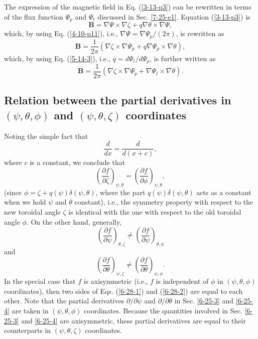 \documentclass{llncs}
\begin{document}
The expression of the magnetic field in Eq. (\ref{3-13-p3}) can be rewritten
in terms of the flux function $\Psi_p$ and $\Psi_t$ discussed in Sec.
\ref{7-25-e1}. Equation (\ref{3-13-p3}) is
\begin{equation}
  \label{3-20-a2} \mathbf{B}= \nabla \Psi \times \nabla \zeta + q \nabla
  \theta \times \nabla \Psi,
\end{equation}
which, by using Eq. (\ref{4-10-p11}), i.e., $\nabla \Psi = \nabla \Psi_p / (2
\pi)$, is rewritten as
\begin{equation}
  \label{4-10-p8} \mathbf{B}= \frac{1}{2 \pi} (\nabla \zeta \times \nabla
  \Psi_p + q \nabla \Psi_p \times \nabla \theta),
\end{equation}
which, by using Eq. (\ref{5-14-3}), i.e., $q = d \Psi_t / d \Psi_p$, is
further written as
\begin{equation}
  \label{6-30-e1} \mathbf{B}= \frac{1}{2 \pi} (\nabla \zeta \times \nabla
  \Psi_p + \nabla \Psi_t \times \nabla \theta) .
\end{equation}
\subsection{Relation between the partial derivatives in $(\psi, \theta, \phi)$
and $(\psi, \theta, \zeta)$ coordinates}

Noting the simple fact that
\begin{equation}
  \frac{d}{d x} = \frac{d}{d (x + c)},
\end{equation}
where $c$ is a constant, we conclude that
\begin{equation}
  \left( \frac{\partial f}{\partial \zeta} \right)_{\psi, \theta} = \left(
  \frac{\partial f}{\partial \phi} \right)_{\psi, \theta},
\end{equation}
(since $\phi = \zeta + q (\psi) \delta (\psi, \theta)$, where the part $q
(\psi) \delta (\psi, \theta)$ acts as a constant when we hold $\psi$ and
$\theta$ constant), i.e., the symmetry property with respect to the new
toroidal angle $\zeta$ is identical with the one with respect to the old
toroidal angle $\phi$. On the other hand, generally,
\begin{equation}
  \label{6-28-1} \left( \frac{\partial f}{\partial \psi} \right)_{\theta,
  \zeta} \neq \left( \frac{\partial f}{\partial \psi} \right)_{\theta, \phi}
\end{equation}
and
\begin{equation}
  \label{6-28-2} \left( \frac{\partial f}{\partial \theta} \right)_{\psi,
  \zeta} \neq \left( \frac{\partial f}{\partial \theta} \right)_{\psi, \phi} .
\end{equation}
In the special case that $f$ is axisymmetric (i.e., $f$ is independent of
$\phi$ in $(\psi, \theta, \phi)$ coordinates), then two sides of Eqs.
(\ref{6-28-1}) and (\ref{6-28-2}) are equal to each other. Note that the
partial derivatives $\partial / \partial \psi$ and $\partial / \partial
\theta$ in Sec. \ref{6-25-3} and \ref{6-25-4} are taken in $(\psi, \theta,
\phi)$ coordinates. Because the quantities involved in Sec. \ref{6-25-3} and
\ref{6-25-4} are axisymmetric, these partial derivatives are equal to their
counterparts in $(\psi, \theta, \zeta)$ coordinates.
\end{document}
